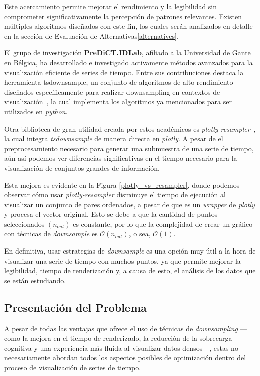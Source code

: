 Este acercamiento permite mejorar el rendimiento y la legibilidad sin comprometer significativamente la percepción de patrones relevantes. Existen múltiples algoritmos diseñados con este fin, los cuales serán analizados en detalle en la sección de Evaluación de Alternativas\ref{alternatives}.

\squashedplot
\downsample

El grupo de investigación \textbf{PreDiCT.IDLab}, afiliado a la Universidad de Gante en Bélgica, ha desarrollado e investigado activamente métodos avanzados para la visualización eficiente de series de tiempo. Entre sus contribuciones destaca la herramienta tsdownsample, un conjunto de algoritmos de alto rendimiento diseñados específicamente para realizar downsampling en contextos de visualización~\cite{tsdownsample}, la cual implementa los algoritmos ya mencionados para ser utilizados en \textit{python}.

Otra biblioteca de gran utilidad creada por estos académicos es \textit{plotly-resampler}~\cite{plotly-resampler}, la cual integra \textit{tsdownsample} de manera directa en \textit{plotly}. A pesar de el preprocesamiento necesario para generar una submuestra de una serie de tiempo, aún así podemos ver diferencias significativas en el tiempo necesario para la visualización de conjuntos grandes de información.

Esta mejora es evidente en la Figura \ref{plotly_vs_resampler}, donde podemos observar cómo usar \textit{plotly-resampler} disminuye el tiempo de ejecución al visualizar un conjunto de pares ordenados, a pesar de que es un \textit{wrapper} de \textit{plotly} y procesa el vector original. Esto se debe a que la cantidad de puntos seleccionados $(n_{out})$ es constante, por lo que la complejidad de crear un gráfico con técnicas de \textit{downsample} es $\mathcal{O}(n_{out})$, o sea, $\mathcal{O}(1)$.

\plotlyresampler

En definitiva, usar estrategias de \textit{downsample} es una opción muy útil a la hora de visualizar una serie de tiempo con muchos puntos, ya que permite mejorar la legibilidad, tiempo de renderización y, a causa de esto, el análisis de los datos que se están estudiando.

\subsection{Presentación del Problema}

A pesar de todas las ventajas que ofrece el uso de técnicas de \textit{downsampling} —como la mejora en el tiempo de renderizado, la reducción de la sobrecarga cognitiva y una experiencia más fluida al visualizar datos densos—, estas no necesariamente abordan todos los aspectos posibles de optimización dentro del proceso de visualización de series de tiempo.

